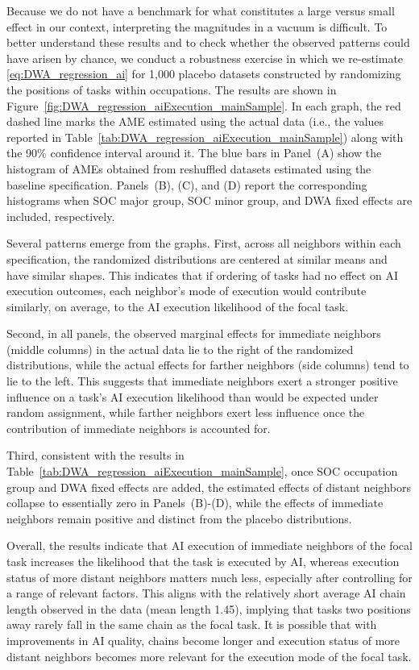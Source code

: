 Because we do not have a benchmark for what constitutes a large versus small effect in our context, interpreting the magnitudes in a vacuum is difficult.
To better understand these results and to check whether the observed patterns could have arisen by chance, we conduct a robustness exercise in which we re-estimate \eqref{eq:DWA_regression_ai} for 1,000 placebo datasets constructed by randomizing the positions of tasks within occupations.
The results are shown in Figure~\ref{fig:DWA_regression_aiExecution_mainSample}.
In each graph, the red dashed line marks the AME estimated using the actual data (i.e., the values reported in Table~\ref{tab:DWA_regression_aiExecution_mainSample}) along with the 90\% confidence interval around it.
The blue bars in Panel~(A) show the histogram of AMEs obtained from reshuffled datasets estimated using the baseline specification.  
Panels~(B), (C), and (D) report the corresponding histograms when SOC major group, SOC minor group, and DWA fixed effects are included, respectively.

Several patterns emerge from the graphs.
First, across all neighbors within each specification, the randomized distributions are centered at similar means and have similar shapes.
This indicates that if ordering of tasks had no effect on AI execution outcomes, each neighbor's mode of execution would contribute similarly, on average, to the AI execution likelihood of the focal task.

Second, in all panels, the observed marginal effects for immediate neighbors (middle columns) in the actual data lie to the right of the randomized distributions, while the actual effects for farther neighbors (side columns) tend to lie to the left.
This suggests that immediate neighbors exert a stronger positive influence on a task's AI execution likelihood than would be expected under random assignment, while farther neighbors exert less influence once the contribution of immediate neighbors is accounted for.

Third, consistent with the results in Table~\ref{tab:DWA_regression_aiExecution_mainSample}, once SOC occupation group and DWA fixed effects are added, the estimated effects of distant neighbors collapse to essentially zero in Panels~(B)-(D), while the effects of immediate neighbors remain positive and distinct from the placebo distributions.

Overall, the results indicate that AI execution of immediate neighbors of the focal task increases the likelihood that the task is executed by AI, whereas execution status of more distant neighbors matters much less, especially after controlling for a range of relevant factors.
This aligns with the relatively short average AI chain length observed in the data (mean length 1.45), implying that tasks two positions away rarely fall in the same chain as the focal task.  
It is possible that with improvements in AI quality, chains become longer and execution status of more distant neighbors becomes more relevant for the execution mode of the focal task.  
